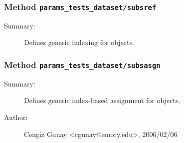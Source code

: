 \subsubsection[Method \texttt{subsref}]{Method \texttt{params\_tests\_dataset/subsref}}%
%
\label{ref_params_tests_dataset__subsref}%
\hypertarget{ref_params_tests_dataset__subsref}{}%
\begin{description}
\item[Summary:]Defines generic indexing for objects.
%
%
%
%
%
%
%
%
\end{description}
\methodline%
\subsubsection[Method \texttt{subsasgn}]{Method \texttt{params\_tests\_dataset/subsasgn}}%
%
\label{ref_params_tests_dataset__subsasgn}%
\hypertarget{ref_params_tests_dataset__subsasgn}{}%
\begin{description}
\item[Summary:]Defines generic index-based assignment for objects.
%
%
%
%
%
%
%
\item[Author:]%
Cengiz Gunay <cgunay@emory.edu>, 2006/02/06%
\end{description}
\methodline%
